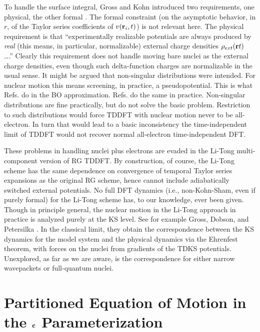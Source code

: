 To handle the surface integral, Gross and Kohn introduced two requirements,
one physical, the other formal \cite{GrossKohn90}. The formal constraint (on
the asymptotic behavior, in $r$, of the Taylor series coefficients of $v(%
{\bf r}_{i},t)$) is not relevant here. The physical requirement is that
``experimentally realizable potentials are always produced by {\em real}
(this means, in particular, normalizable) external charge densities $\rho
_{ext}({\bf r}t)$ \ldots .'' Clearly this requirement does not handle moving
bare nuclei as the external charge densities, even though such
delta-function charges are normalizable in the usual sense. It might be
argued that non-singular distributions were intended. For nuclear motion
this means screening, in practice, a pseudopotential. This is what Refs. 
\cite{Teil92,Fois88} do in the BO approximation. Refs. \cite%
{Saalmann96,Knospe99} do the same in practice. Non-singular distributions
are fine practically, but do not solve the basic problem. Restriction to
such distributions would force TDDFT with nuclear motion never to be
all-electron. In turn that would lead to a basic inconsistency the
time-independent limit of TDDFT would not recover normal all-electron
time-independent DFT.

These problems in handling nuclei plus electrons are evaded in the Li-Tong 
\cite{LiTong86} multi-component version of RG TDDFT. By construction, of
course, the Li-Tong scheme has the same dependence on convergence of
temporal Taylor series expansions as the original RG scheme, hence cannot
include adiabatically switched external potentials. No full DFT dynamics
(i.e., non-Kohn-Sham, even if purely formal) for the Li-Tong scheme has, to
our knowledge, ever been given. Though in principle general, the nuclear
motion in the Li-Tong approach in practice is analyzed purely at the KS
level. See for example Gross, Dobson, and Petersilka \cite{Gross96}. In the
classical limit, they obtain the correspondence between the KS dynamics for
the model system and the physical dynamics via the Ehrenfest theorem, with
forces on the nuclei from gradients of the TDKS potentials. Unexplored, as
far as we are aware, is the correspondence for either narrow wavepackets or
full-quantum nuclei.\cite{Xchneglect}

\section{Partitioned Equation of Motion in the ${\bf c}$ Parameterization}

